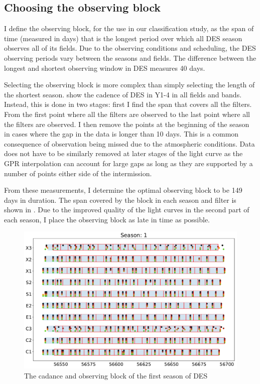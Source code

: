 \subsection{Choosing the observing block} \label{sec:ObsBlock}
I define the observing block, for the use in our classification study, as the span of time (measured in days) that is the longest period over which all DES season observes all of its fields. Due to the observing conditions and scheduling, the DES observing periods vary between the seasons and fields. The difference between the longest and shortest observing window in DES measures 40 days.

Selecting the observing block is more complex than simply selecting the length of the shortest season.  show the cadence of DES in Y1-4 in all fields and bands. Instead, this is done in two stages: first I find the span that covers all the filters. From the first point where all the filters are observed to the last point where all the filters are observed. I then remove the points at the beginning of the season in cases where the gap in the data is longer than 10 days. This is a common consequence of observation being missed due to the atmospheric conditions. Data does not have to be similarly removed at later stages of the light curve as the GPR interpolation can account for large gaps as long as they are supported by a number of points either side of the intermission.

From these measurements, I determine the optimal observing block to be 149 days in duration. The span covered by the block in each season and filter is shown in . Due to the improved quality of the light curves in the second part of each season, I place the observing block as late in time as possible.

\begin{figure}[h]
  \includegraphics[width=\textwidth]{Figures/Chapter5/ObsBlock_Season1.pdf}
  \caption{The cadance and observing block of the first season of DES}
  \label{fig:ObsBlock1}
\end{figure}


